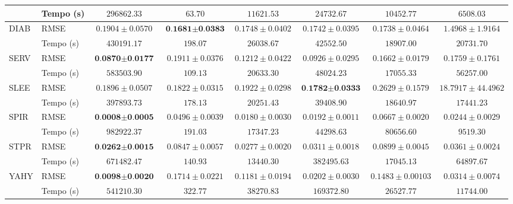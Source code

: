 \begin{landscape}
\begin{table}[h]
\begin{tabular}{l|l|c@{\hskip 5pt}c@{\hskip 5pt}c@{\hskip 5pt}c@{\hskip 5pt}c@{\hskip 5pt}c}
                                    & Tempo (s) & $296862.33$ & $63.70$ & $11621.53$ & $24732.67$ & $10452.77$ & $6508.03$ \\
            \midrule
            \multirow{2}{*}{DIAB}   & RMSE & $0.1904 \pm 0.0570$ & $\textbf{0.1681} \pm \textbf{0.0383}$ & $0.1748 \pm 0.0402$ & $0.1742 \pm 0.0395$ & $0.1738 \pm 0.0464$ & $1.4968 \pm 1.9164$ \\
                                    & Tempo (s) & $430191.17$ & $198.07$ & $26038.67$ & $42552.50$ & $18907.00$ & $20731.70$ \\
            \midrule
            \multirow{2}{*}{SERV}   & RMSE & $\textbf{0.0870} \pm \textbf{0.0177}$ & $0.1911 \pm 0.0376$ & $0.1212 \pm 0.0422$ & $0.0926 \pm 0.0295$ & $0.1662 \pm 0.0179$ & $0.1759 \pm 0.1761$ \\
                                    & Tempo (s) & $583503.90$ & $109.13$ & $20633.30$ & $48024.23$ & $17055.33$ & $56257.00$ \\
            \midrule
            \multirow{2}{*}{SLEE}   & RMSE & $0.1896 \pm 0.0507$ & $0.1822 \pm 0.0315$ & $0.1922 \pm 0.0298$ & $\textbf{0.1782} \pm \textbf{0.0333}$ & $0.2629 \pm 0.1579$ & $18.7917 \pm 44.4962$ \\
                                    & Tempo (s) & $397893.73$ & $178.13$ & $20251.43$ & $39408.90$ & $18640.97$ & $17441.23$ \\
            \midrule
            \multirow{2}{*}{SPIR}   & RMSE & $\textbf{0.0008} \pm \textbf{0.0005}$ & $0.0496 \pm 0.0039$ & $0.0180 \pm 0.0030$ & $0.0192 \pm 0.0011$ & $0.0667 \pm 0.0020$ & $0.0244 \pm 0.0029$ \\
                                    & Tempo (s) & $982922.37$ & $191.03$ & $17347.23$ & $44298.63$ & $80656.60$ & $9519.30$ \\
            \midrule
            \multirow{2}{*}{STPR}   & RMSE & $\textbf{0.0262} \pm \textbf{0.0015}$ & $0.0847 \pm 0.0057$ & $0.0277 \pm 0.0020$ & $0.0311 \pm 0.0018$ & $0.0899 \pm 0.0045$ & $0.0361 \pm 0.0024$ \\
                                    & Tempo (s) & $671482.47$ & $140.93$ & $13440.30$ & $382495.63$ & $17045.13$ & $64897.67$ \\
            \midrule
            \multirow{2}{*}{YAHY}   & RMSE & $\textbf{0.0098} \pm \textbf{0.0020}$ & $0.1714 \pm 0.0221$ & $0.1181 \pm 0.0194$ & $0.0202 \pm 0.0030$ & $0.1483 \pm 0.00103$ & $0.0314 \pm 0.0074$ \\
                                    & Tempo (s) & $541210.30$ & $322.77$ & $38270.83$ & $169372.80$ & $26527.77$ & $11744.00$ \\

\end{tabular}
\end{table}
\end{landscape}
